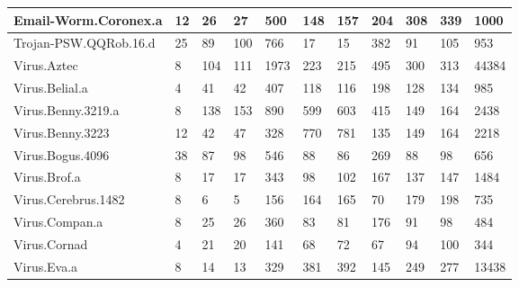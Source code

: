 \begin{small}
\begin{longtable}{|l|l|l|l|l|l|l|l|l|l|l|}
Email-Worm.Coronex.a	&	12	&	26	&	27	&	500	&	148	&	157	&	204	&	308	&	339	&	1000 \\ \hline
Trojan-PSW.QQRob.16.d	&	25	&	89	&	100	&	766	&	17	&	15	&	382	&	91	&	105	&	953	\\ \hline
Virus.Aztec	&	8	&	104	&	111	&	1973	&	223	&	215	&	495	&	300	&	313	&	44384	\\ \hline
Virus.Belial.a	&	4	&	41	&	42	&	407	&	118	&	116	&	198	&	128	&	134	&	985	\\ \hline
Virus.Benny.3219.a	&	8	&	138	&	153	&	890	&	599	&	603	&	415	&	149	&	164	&	2438	\\ \hline
Virus.Benny.3223	&	12	&	42	&	47	&	328	&	770	&	781	&	135	&	149	&	164	&	2218	\\ \hline
Virus.Bogus.4096	&	38	&	87	&	98	&	546	&	88	&	86	&	269	&	88	&	98	&	656	\\ \hline
Virus.Brof.a	&	8	&	17	&	17	&	343	&	98	&	102	&	167	&	137	&	147	&	1484	\\ \hline
Virus.Cerebrus.1482	&	8	&	6	&	5	&	156	&	164	&	165	&	70	&	179	&	198	&	735	\\ \hline
Virus.Compan.a	&	8	&	25	&	26	&	360	&	83	&	81	&	176	&	91	&	98	&	484	\\ \hline
Virus.Cornad	&	4	&	21	&	20	&	141	&	68	&	72	&	67	&	94	&	100	&	344	\\ \hline
Virus.Eva.a	&	8	&	14	&	13	&	329	&	381	&	392	&	145	&	249	&	277	&	13438	\\ \hline

\end{longtable}
\end{small}
